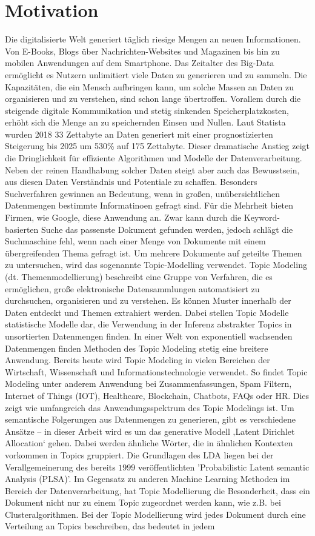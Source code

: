 \documentclass[german,version-2020-11]{uzl-thesis}
\begin{document}
\section{Motivation}
Die digitalisierte Welt generiert täglich riesige Mengen an neuen Informationen. Von E-Books, Blogs über Nachrichten-Websites und Magazinen bis hin zu mobilen Anwendungen auf dem Smartphone. Das Zeitalter des Big-Data ermöglicht es Nutzern unlimitiert viele Daten zu generieren und zu sammeln. Die Kapazitäten, die ein Mensch aufbringen kann, um solche Massen an Daten zu organisieren und zu verstehen, sind schon lange übertroffen. Vorallem durch die steigende digitale Kommunikation und stetig sinkenden Speicherplatzkosten, erhöht sich die Menge an zu speichernden Einsen und Nullen. Laut Statista wurden 2018 33 Zettabyte an Daten generiert mit einer prognostizierten Steigerung bis 2025 um 530\% auf 175 Zettabyte. Dieser dramatische Anstieg zeigt die Dringlichkeit für effiziente Algorithmen und Modelle der Datenverarbeitung. Neben der reinen Handhabung solcher Daten steigt aber auch das Bewusstsein, aus diesen Daten Verständnis und Potentiale zu schaffen. Besonders Suchverfahren gewinnen an Bedeutung, wenn in großen, unübersichtlichen Datenmengen bestimmte Informatinoen gefragt sind. Für die Mehrheit bieten Firmen, wie Google, diese Anwendung an. Zwar kann durch die Keyword-basierten Suche das passenste Dokument gefunden werden, jedoch schlägt die Suchmaschine fehl, wenn nach einer Menge von Dokumente mit einem übergreifenden Thema gefragt ist. Um mehrere Dokumente auf geteilte Themen zu untersuchen, wird das sogenannte Topic-Modelling verwendet. Topic Modeling (dt. Themenmodellierung) beschreibt eine Gruppe von Verfahren, die es ermöglichen, große elektronische Datensammlungen automatisiert zu durchsuchen, organisieren und zu verstehen. Es können Muster innerhalb der Daten entdeckt und Themen extrahiert werden. Dabei stellen Topic Modelle statistische Modelle dar, die Verwendung in der Inferenz abstrakter Topics in unsortierten Datenmengen finden. In einer Welt von exponentiell wachsenden Datenmengen finden Methoden des Topic Modeling stetig eine breitere Anwendung. Bereits heute wird Topic Modeling in vielen Bereichen der Wirtschaft, Wissenschaft und Informationstechnologie verwendet. So findet Topic Modeling unter anderem Anwendung bei Zusammenfassungen, Spam Filtern, Internet of Things (IOT), Healthcare, Blockchain, Chatbots, FAQs oder HR. Dies zeigt wie umfangreich das Anwendungsspektrum des Topic Modelings ist. Um semantische Folgerungen aus Datenmengen zu generieren, gibt es verschiedene Ansätze – in dieser Arbeit wird es um das generative Modell ‚Latent Dirichlet Allocation‘ gehen. Dabei werden ähnliche Wörter, die in ähnlichen Kontexten vorkommen in Topics gruppiert. Die Grundlagen des LDA liegen bei der Verallgemeinerung des bereits $1999$ veröffentlichten 'Probabilistic Latent semantic Analysis (PLSA)'. Im Gegensatz zu anderen Machine Learning Methoden im Bereich der Datenverarbeitung, hat Topic Modellierung die Besonderheit, dass ein Dokument nicht nur zu einem Topic zugeordnet werden kann, wie z.B. bei Clusteralgorithmen. Bei der Topic Modellierung wird jedes Dokument durch eine Verteilung an Topics beschreiben, das bedeutet in jedem 
\end{document}
